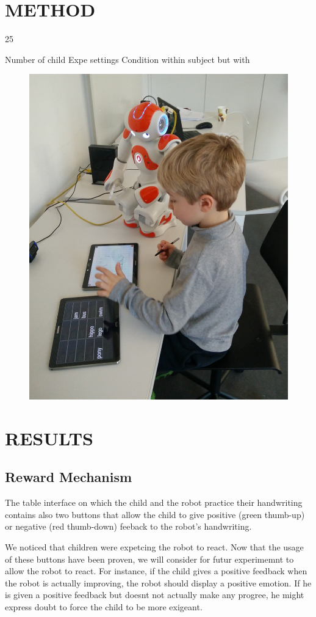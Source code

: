 \documentclass[letterpaper, 10 pt, conference]{ieeeconf}  %
\begin{document}
\section{METHOD}
25

Number of child
Expe settings
Condition within subject but with 
\begin{figure}
\centering
\includegraphics[width=0.7\linewidth]{./figures/s2s_photo.jpg}
\caption[Side by SIde Condition]{}
\caption{}
\label{fig:s2s_photo}
\end{figure}


\section{RESULTS}

\subsection{Reward Mechanism}
The table interface on which the child and the robot practice their handwriting contains also two buttons that allow the child to give positive (green thumb-up) or negative (red thumb-down) feeback to the robot's handwriting.

We noticed that children were expetcing the robot to react. 
Now that the usage of these buttons have been proven, we will consider for futur experimemnt to allow the robot to react. 
For instance, if the child gives a positive feedback when the robot is actually improving, the robot should display a positive emotion.
If he is given a positive feedback but doesnt not actually make any progree, he might express doubt to force the child to be more exigeant. 
\end{document}
